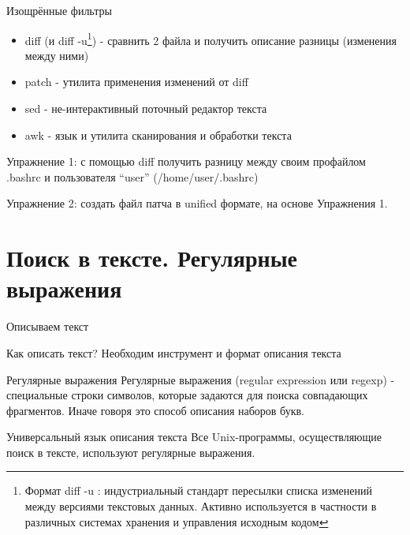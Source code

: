 \begin{frame}{Изощрённые фильтры }
  \begin{itemize}
    \item \alert{diff} (и \alert{diff -u}\footnote{Формат \alert{diff -u} : индустриальный стандарт пересылки списка изменений между версиями текстовых данных. Активно используется в частности в различных системах хранения и управления исходным кодом}) - сравнить 2 файла и получить описание разницы (изменения между ними)
    \item \alert{patch} - утилита применения изменений от diff \pause
    \item \alert{sed} - не-интерактивный поточный редактор текста 
    \item \alert{awk} - язык и утилита сканирования и обработки текста \pause
  \end{itemize}
  
  \alert{Упражнение 1}: с помощью \alert{diff} получить разницу между своим профайлом .bashrc и пользователя ``user'' (/home/user/.bashrc)
  
  \alert{Упражнение 2}: создать файл патча в unified формате, на основе Упражнения 1.

\end{frame}



\section{Поиск в тексте. Регулярные выражения}

\begin{frame}{Описываем текст}

  \begin{block}{Как описать текст?}
    Необходим инструмент и формат описания текста
  \end{block} \pause

  \begin{block}{Регулярные выражения}
    \alert{Регулярные выражения (regular expression или regexp)} -  специальные строки символов, которые задаются для поиска совпадающих фрагментов. Иначе говоря это способ описания наборов букв. 
  \end{block} \pause

  \begin{block}{Универсальный язык описания текста}
    Все Unix-программы, осуществляющие поиск в тексте, используют регулярные выражения.
  \end{block}

\end{frame}

